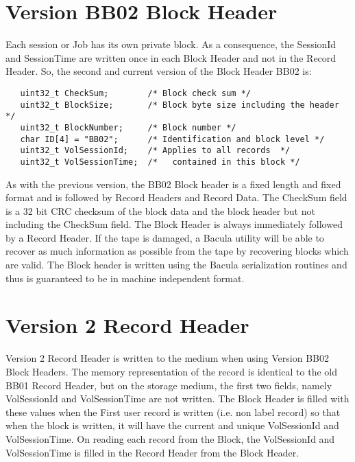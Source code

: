 \section{Version BB02 Block Header}

Each session or Job has its own private block. As a consequence, the SessionId
and SessionTime are written once in each Block Header and not in the Record
Header. So, the second and current version of the Block Header BB02 is:

\footnotesize
\begin{verbatim}
   uint32_t CheckSum;        /* Block check sum */
   uint32_t BlockSize;       /* Block byte size including the header */
   uint32_t BlockNumber;     /* Block number */
   char ID[4] = "BB02";      /* Identification and block level */
   uint32_t VolSessionId;    /* Applies to all records  */
   uint32_t VolSessionTime;  /*   contained in this block */
\end{verbatim}
\normalsize

As with the previous version, the BB02 Block header is a fixed length and
fixed format and is followed by Record Headers and Record Data. The CheckSum
field is a 32 bit CRC checksum of the block data and the block header but not
including the CheckSum field. The Block Header is always immediately followed
by a Record Header. If the tape is damaged, a Bacula utility will be able to
recover as much information as possible from the tape by recovering blocks
which are valid. The Block header is written using the Bacula serialization
routines and thus is guaranteed to be in machine independent format.

\section{Version 2 Record Header}

Version 2 Record Header is written to the medium when using Version BB02 Block
Headers. The memory representation of the record is identical to the old BB01
Record Header, but on the storage medium, the first two fields, namely
VolSessionId and VolSessionTime are not written. The Block Header is filled
with these values when the First user record is written (i.e. non label
record) so that when the block is written, it will have the current and unique
VolSessionId and VolSessionTime. On reading each record from the Block, the
VolSessionId and VolSessionTime is filled in the Record Header from the Block
Header.

